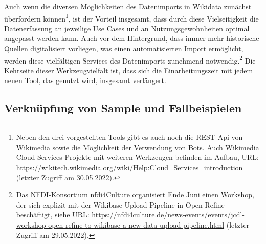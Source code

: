 Auch wenn die diversen Möglichkeiten des Datenimports in Wikidata zunächst überfordern können\footnote{Neben den drei vorgestellten Tools gibt es auch noch die REST-Api von Wikimedia sowie die Möglichkeit der Verwendung von Bots. Auch Wikimedia Cloud Services-Projekte mit weiteren Werkzeugen befinden im Aufbau, URL: \url{https://wikitech.wikimedia.org/wiki/Help:Cloud_Services_introduction} (letzter Zugriff am 30.05.2022).}, ist der Vorteil insgesamt, dass durch diese Vielseitigkeit die Datenerfassung an jeweilige Use Cases und an Nutzungsgewohnheiten optimal angepasst werden kann. Auch vor dem Hintergrund, dass immer mehr historische Quellen digitalisiert vorliegen, was einen automatisierten Import ermöglicht, werden diese vielfältigen Services des Datenimports zunehmend notwendig.\footnote{Das NFDI-Konsortium nfdi4Culture organisiert Ende Juni einen Workshop, der sich explizit mit der Wikibase-Upload-Pipeline in Open Refine beschäftigt, siehe URL: \url{https://nfdi4culture.de/news-events/events/jcdl-workshop-open-refine-to-wikibase-a-new-data-upload-pipeline.html} (letzter Zugriff am 29.05.2022).} Die Kehrseite dieser Werkzeugvielfalt ist, dass sich die Einarbeitungszeit mit jedem neuen Tool, das genutzt wird, insgesamt verlängert.

\subsection{Verknüpfung von Sample und Fallbeispielen}

